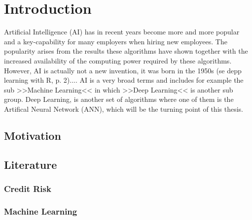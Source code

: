 \chapter{Introduction}
Artificial Intelligence (AI) has in recent years become more and more popular and a key-capability for many employers when hiring new employees. The popularity arises from the results these algorithms have shown together with the increased availability of the computing power required by these algorithms. However, AI is actually not a new invention, it was born in the 1950s (se depp learning with R, p. 2).... 
AI is a very broad terms and includes for example the sub >>Machine Learning<< in which >>Deep Learning<< is another sub group. Deep Learning, is another set of algorithms where one of them is the Artifical Neural Network (ANN), which will be the turning point of this thesis. 

\section{Motivation}

\section{Literature}

\subsection{Credit Risk}

\subsection{Machine Learning}
